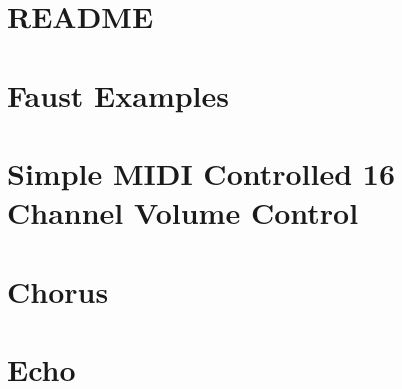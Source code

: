 \let\mypdfximage\pdfximage\def\pdfximage{\immediate\mypdfximage}\documentclass[twoside]{book}
\newcommand{\+}{\discretionary{\mbox{\scriptsize$\hookleftarrow$}}{}{}}
\begin{document}
\chapter{R\+E\+A\+D\+ME}
\label{md__c_1__users_fab_src__github_branches__neural_amp_modeler_plugin_i_plug2__dependencies__build_95df560e7fbdc1843ba220ac74784b51}

\chapter{Faust Examples}
\label{md__c_1__users_fab_src__github_branches__neural_amp_modeler_plugin_i_plug2__dependencies__build_3a2e795a1aaf6ec384d9e94d48346ccc}

\chapter{Simple M\+I\+DI Controlled 16 Channel Volume Control}
\label{md__c_1__users_fab_src__github_branches__neural_amp_modeler_plugin_i_plug2__dependencies__build_793b0fe074a2a3427ed317633bb9b4fe}

\chapter{Chorus}
\label{md__c_1__users_fab_src__github_branches__neural_amp_modeler_plugin_i_plug2__dependencies__build_df114fe5935eda2a01d303fbc71a60ae}

\chapter{Echo}
\label{md__c_1__users_fab_src__github_branches__neural_amp_modeler_plugin_i_plug2__dependencies__build_35b41799764855ff70be33ce602cf85f}

\end{document}
